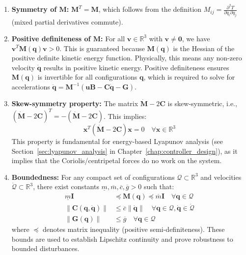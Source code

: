 \begin{enumerate}
\item \textbf{Symmetry of $\mathbf{M}$:} $\mathbf{M}^T = \mathbf{M}$, which follows from the definition $M_{ij} = \frac{\partial^2 T}{\partial \dot{q}_i \partial \dot{q}_j}$ (mixed partial derivatives commute).

\item \textbf{Positive definiteness of $\mathbf{M}$:} For all $\mathbf{v} \in \mathbb{R}^3$ with $\mathbf{v} \neq \mathbf{0}$, we have $\mathbf{v}^T \mathbf{M}(\mathbf{q}) \mathbf{v} > 0$. This is guaranteed because $\mathbf{M}(\mathbf{q})$ is the Hessian of the positive definite kinetic energy function. Physically, this means any non-zero velocity $\dot{\mathbf{q}}$ results in positive kinetic energy. Positive definiteness ensures $\mathbf{M}(\mathbf{q})$ is invertible for all configurations $\mathbf{q}$, which is required to solve for accelerations $\ddot{\mathbf{q}} = \mathbf{M}^{-1}(\mathbf{u B} - \mathbf{C}\dot{\mathbf{q}} - \mathbf{G})$.

\item \textbf{Skew-symmetry property:} The matrix $\dot{\mathbf{M}} - 2\mathbf{C}$ is skew-symmetric, i.e., $(\dot{\mathbf{M}} - 2\mathbf{C})^T = -(\dot{\mathbf{M}} - 2\mathbf{C})$. This implies:
\begin{equation}
\mathbf{x}^T(\dot{\mathbf{M}} - 2\mathbf{C})\mathbf{x} = 0 \quad \forall \mathbf{x} \in \mathbb{R}^3
\label{eq:skew_symmetry}
\end{equation}
This property is fundamental for energy-based Lyapunov analysis (see Section~\ref{sec:lyapunov_analysis} in Chapter~\ref{chap:controller_design}), as it implies that the Coriolis/centripetal forces do no work on the system.

\item \textbf{Boundedness:} For any compact set of configurations $\mathcal{Q} \subset \mathbb{R}^3$ and velocities $\dot{\mathcal{Q}} \subset \mathbb{R}^3$, there exist constants $\underline{m}, \overline{m}, \overline{c}, \overline{g} > 0$ such that:
\begin{align}
\underline{m} \mathbf{I} &\preceq \mathbf{M}(\mathbf{q}) \preceq \overline{m} \mathbf{I} \quad \forall \mathbf{q} \in \mathcal{Q} \label{eq:mass_bounds} \\
\|\mathbf{C}(\mathbf{q}, \dot{\mathbf{q}})\| &\leq \overline{c} \|\dot{\mathbf{q}}\| \quad \forall \mathbf{q} \in \mathcal{Q}, \dot{\mathbf{q}} \in \dot{\mathcal{Q}} \label{eq:coriolis_bounds} \\
\|\mathbf{G}(\mathbf{q})\| &\leq \overline{g} \quad \forall \mathbf{q} \in \mathcal{Q} \label{eq:gravity_bounds}
\end{align}
where $\preceq$ denotes matrix inequality (positive semi-definiteness). These bounds are used to establish Lipschitz continuity and prove robustness to bounded disturbances.
\end{enumerate}

